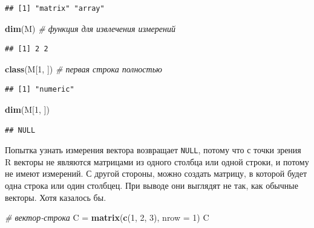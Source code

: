 \documentclass[
]{book}
\newenvironment{Shaded}{\begin{snugshade}}{\end{snugshade}}
\newcommand{\AttributeTok}[1]{\textcolor[rgb]{0.13,0.29,0.53}{#1}}
\newcommand{\CommentTok}[1]{\textcolor[rgb]{0.56,0.35,0.01}{\textit{#1}}}
\newcommand{\DecValTok}[1]{\textcolor[rgb]{0.00,0.00,0.81}{#1}}
\newcommand{\FunctionTok}[1]{\textcolor[rgb]{0.13,0.29,0.53}{\textbf{#1}}}
\newcommand{\NormalTok}[1]{#1}
\newcommand{\OtherTok}[1]{\textcolor[rgb]{0.56,0.35,0.01}{#1}}
\theoremstyle{definition}
\theoremstyle{definition}
\theoremstyle{definition}
\theoremstyle{definition}
\theoremstyle{remark}
\begin{document}
\begin{verbatim}
## [1] "matrix" "array"
\end{verbatim}

\begin{Shaded}
\begin{Highlighting}[]
\FunctionTok{dim}\NormalTok{(M) }\CommentTok{\# функция для извлечения измерений}
\end{Highlighting}
\end{Shaded}

\begin{verbatim}
## [1] 2 2
\end{verbatim}

\begin{Shaded}
\begin{Highlighting}[]
\FunctionTok{class}\NormalTok{(M[}\DecValTok{1}\NormalTok{, ]) }\CommentTok{\# первая строка полностью}
\end{Highlighting}
\end{Shaded}

\begin{verbatim}
## [1] "numeric"
\end{verbatim}

\begin{Shaded}
\begin{Highlighting}[]
\FunctionTok{dim}\NormalTok{(M[}\DecValTok{1}\NormalTok{, ]) }
\end{Highlighting}
\end{Shaded}

\begin{verbatim}
## NULL
\end{verbatim}

Попытка узнать измерения вектора возвращает \texttt{NULL}, потому что с точки зрения R векторы не являются матрицами из одного столбца или одной строки, и потому не имеют измерений. С другой стороны, можно создать матрицу, в которой будет одна строка или один столбцец. При выводе они выглядят не так, как обычные векторы. Хотя казалось бы.

\begin{Shaded}
\begin{Highlighting}[]
\CommentTok{\# вектор{-}строка}
\NormalTok{C }\OtherTok{=} \FunctionTok{matrix}\NormalTok{(}\FunctionTok{c}\NormalTok{(}\DecValTok{1}\NormalTok{, }\DecValTok{2}\NormalTok{, }\DecValTok{3}\NormalTok{), }\AttributeTok{nrow =} \DecValTok{1}\NormalTok{)}
\NormalTok{C}
\end{Highlighting}
\end{Shaded}
\end{document}
